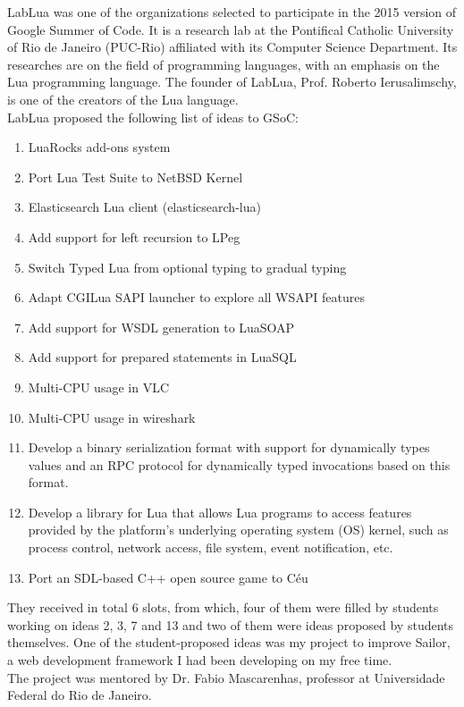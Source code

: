 \documentclass{article}
\begin{document}
LabLua was one of the organizations selected to participate in the 2015 version of Google Summer of Code. It is a research lab at the Pontifical Catholic University of Rio de Janeiro (PUC-Rio) affiliated with its Computer Science Department. Its researches are on the field of programming languages, with an emphasis on the Lua programming language. The founder of LabLua, Prof. Roberto Ierusalimschy, is one of the creators of the Lua language.\\

LabLua proposed the following list of ideas to GSoC: 

\begin{enumerate}\item LuaRocks add-ons system
\item Port Lua Test Suite to NetBSD Kernel
\item Elasticsearch Lua client (elasticsearch-lua)
\item Add support for left recursion to LPeg
\item Switch Typed Lua from optional typing to gradual typing
\item Adapt CGILua SAPI launcher to explore all WSAPI features
\item Add support for WSDL generation to LuaSOAP
\item Add support for prepared statements in LuaSQL
\item Multi-CPU usage in VLC
\item Multi-CPU usage in wireshark
\item Develop a binary serialization format with support for dynamically types values and an RPC protocol for dynamically typed invocations based on this format.
\item Develop a library for Lua that allows Lua programs to access features provided by the platform's underlying operating system (OS) kernel, such as process control, network access, file system, event notification, etc.
\item Port an SDL-based C++ open source game to Céu
\end{enumerate}

They received in total 6 slots, from which, four of them were filled by students working on ideas 2, 3, 7 and 13 and two of them were ideas proposed by students themselves. One of the student-proposed ideas was my project to improve Sailor, a web development framework I had been developing on my free time. \\

The project was mentored by Dr. Fabio Mascarenhas, professor at Universidade Federal do Rio de Janeiro. 
\end{document}

